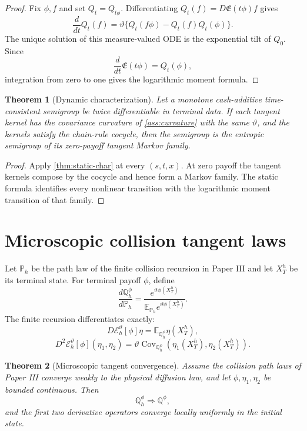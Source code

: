 \documentclass[11pt,reqno]{amsart}
\newtheorem{theorem}{Theorem}[section]
\theoremstyle{definition}
\theoremstyle{remark}
\newcommand{\E}{\mathbb E}
\newcommand{\Pp}{\mathbb P}
\newcommand{\Qp}{\mathbb Q}
\newcommand{\cE}{\mathcal E}
\newcommand{\Cov}{\operatorname{Cov}}
\begin{document}
\begin{proof}
Fix $\phi,f$ and set $Q_t=Q_{t\phi}$.  Differentiating
$Q_t(f)=D\mathfrak E(t\phi)f$ gives
\[
 \frac{d}{dt}Q_t(f)
 =
 \vartheta\{Q_t(f\phi)-Q_t(f)Q_t(\phi)\}.
\]
The unique solution of this measure-valued ODE is the exponential tilt of
$Q_0$.  Since
\[
 \frac{d}{dt}\mathfrak E(t\phi)=Q_t(\phi),
\]
integration from zero to one gives the logarithmic moment formula.
\end{proof}

\begin{theorem}[Dynamic characterization]\label{thm:dynamic-char}
Let a monotone cash-additive time-consistent semigroup be twice differentiable
in terminal data.  If each tangent kernel has the covariance curvature of
\cref{ass:curvature} with the same $\vartheta$, and the kernels satisfy the
chain-rule cocycle, then the semigroup is the entropic semigroup of its
zero-payoff tangent Markov family.
\end{theorem}

\begin{proof}
Apply \cref{thm:static-char} at every $(s,t,x)$.  At zero payoff the tangent
kernels compose by the cocycle and hence form a Markov family.  The static
formula identifies every nonlinear transition with the logarithmic moment
transition of that family.
\end{proof}

\section{Microscopic collision tangent laws}\label{sec:microscopic}

Let $\Pp_h$ be the path law of the finite collision recursion in Paper III and
let $X_T^h$ be its terminal state.  For terminal payoff $\phi$, define
\[
 \frac{d\Qp_h^\phi}{d\Pp_h}
 =
 \frac{e^{\vartheta\phi(X_T^h)}}
 {\E_{\Pp_h}e^{\vartheta\phi(X_T^h)}}.
\]
The finite recursion differentiates exactly:
\[
 D\cE_h^\vartheta[\phi]\eta
 =
 \E_{\Qp_h^\phi}\eta(X_T^h),
\]
\[
 D^2\cE_h^\vartheta[\phi](\eta_1,\eta_2)
 =
 \vartheta\Cov_{\Qp_h^\phi}
 (\eta_1(X_T^h),\eta_2(X_T^h)).
\]

\begin{theorem}[Microscopic tangent convergence]\label{thm:micro-conv}
Assume the collision path laws of Paper III converge weakly to the physical
diffusion law, and let $\phi,\eta_1,\eta_2$ be bounded continuous.  Then
\[
 \Qp_h^\phi\Longrightarrow\Qp^\phi,
\]
and the first two derivative operators converge locally uniformly in the
initial state.
\end{theorem}
\end{document}
